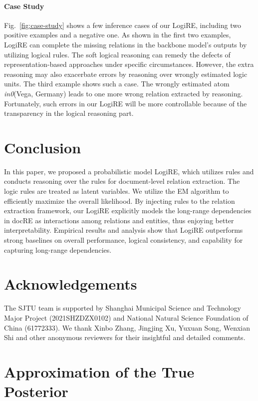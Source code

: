\documentclass[11pt]{article}
\newcommand{\mymodel}{LogiRE\xspace}
\begin{document}
\paragraph{Case Study}
Fig.~\ref{fig:case-study} shows a few inference cases of our \mymodel, including two positive examples and a negative one. As shown in the first two examples, \mymodel can complete the missing relations in the backbone model's outputs by utilizing logical rules. 
The soft logical reasoning can remedy the defects of representation-based approaches under specific circumstances. 
However, the extra reasoning may also exacerbate errors by reasoning over wrongly estimated logic units. The third example shows such a case. The wrongly estimated atom \emph{in0}(Vega, Germany) leads to one more wrong relation extracted by reasoning. Fortunately, such errors in our \mymodel will be more controllable because of the transparency in the logical reasoning part.
 
\section{Conclusion}
\label{sec:conclusion}
In this paper, we proposed a probabilistic model \mymodel, which utilizes rules and conducts reasoning over the rules for document-level relation extraction. The logic rules are treated as latent variables. We utilize the EM algorithm to efficiently maximize the overall likelihood. By injecting rules to the relation extraction framework, our \mymodel explicitly models the long-range dependencies in docRE as interactions among relations and entities, thus enjoying better interpretability. Empirical results and analysis show that \mymodel outperforms strong baselines on overall performance, logical consistency, and capability for capturing long-range dependencies.  
\section*{Acknowledgements}
The SJTU team is supported by Shanghai Municipal Science and Technology Major Project (2021SHZDZX0102) and National Natural Science Foundation of China (61772333). We thank Xinbo Zhang, Jingjing Xu, Yuxuan Song, Wenxian Shi and other anonymous reviewers for their insightful and detailed comments.




\appendix




\section{Approximation of the True Posterior}
\label{sec:appendix:approx}
\end{document}
